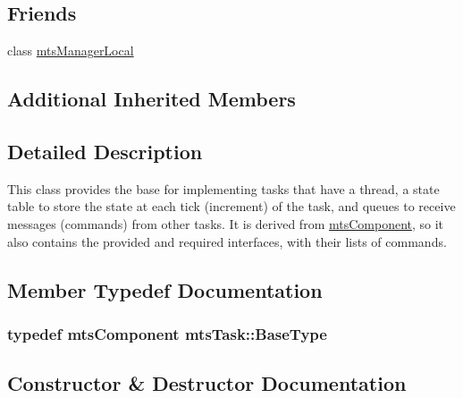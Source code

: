 \subsection*{Friends}
\begin{DoxyCompactItemize}
\item 
class \hyperlink{classmts_task_a31c1c611dbb103ac58ed40d84960baa0}{mts\+Manager\+Local}
\end{DoxyCompactItemize}
\subsection*{Additional Inherited Members}


\subsection{Detailed Description}
This class provides the base for implementing tasks that have a thread, a state table to store the state at each \textquotesingle{}tick\textquotesingle{} (increment) of the task, and queues to receive messages (commands) from other tasks. It is derived from \hyperlink{classmts_component}{mts\+Component}, so it also contains the provided and required interfaces, with their lists of commands. 

\subsection{Member Typedef Documentation}
\hypertarget{classmts_task_aac1f3b293b0dc04205b449899c795b80}{}
\subsubsection[{Base\+Type}]{\setlength{\rightskip}{0pt plus 5cm}typedef {\bf mts\+Component} {\bf mts\+Task\+::\+Base\+Type}}\label{classmts_task_aac1f3b293b0dc04205b449899c795b80}


\subsection{Constructor \& Destructor Documentation}
\hypertarget{classmts_task_a984edec80b837edc155eebc67092faf0}{}

